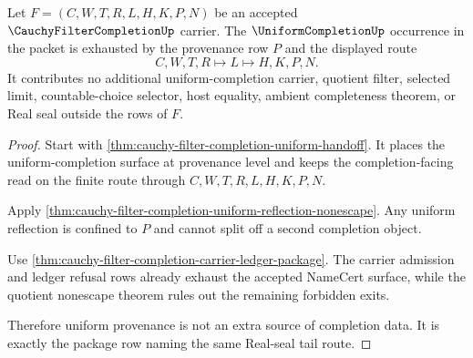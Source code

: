 \begin{theorem}
\label{thm:cauchy-filter-completion-uniform-provenance-exhaustion}
Let $F=(C,W,T,R,L,H,K,P,N)$ be an accepted $\CauchyFilterCompletionUp$ carrier. The $\UniformCompletionUp$ occurrence in the packet is exhausted by the provenance row $P$ and the displayed route
$$
C,W,T,R \longmapsto L \longmapsto H,K,P,N .
$$
It contributes no additional uniform-completion carrier, quotient filter, selected limit, countable-choice selector, host equality, ambient completeness theorem, or Real seal outside the rows of $F$.
\end{theorem}
\begin{proof}
Start with \autoref{thm:cauchy-filter-completion-uniform-handoff}. It places the uniform-completion surface at provenance level and keeps the completion-facing read on the finite route through $C,W,T,R,L,H,K,P,N$.

Apply \autoref{thm:cauchy-filter-completion-uniform-reflection-nonescape}. Any uniform reflection is confined to $P$ and cannot split off a second completion object.

Use \autoref{thm:cauchy-filter-completion-carrier-ledger-package}. The carrier admission and ledger refusal rows already exhaust the accepted NameCert surface, while the quotient nonescape theorem rules out the remaining forbidden exits.

Therefore uniform provenance is not an extra source of completion data. It is exactly the package row naming the same Real-seal tail route.
\end{proof}

